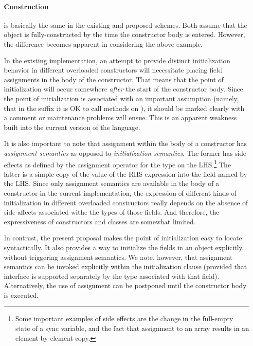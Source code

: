 \paragraph{Construction} is basically the same in the existing and proposed schemes.
Both assume that the object is fully-constructed by the time the constructor
body is entered.  However, the difference becomes apparent in considering the
above example.

In the existing implementation, an attempt to provide distinct
initialization behavior in different overloaded constructors will necessitate placing
field assignments in the body of the constructor.  That means that the point of
initialization will occur somewhere \emph{after} the start of the constructor
body.  Since the point of initialization is associated with an important
assumption (namely, that in the suffix it is OK to call methods on ),
it should be marked clearly with a comment or maintenance problems will ensue.
This is an apparent weakness built into the current version of the language.

It is also important to note that assignment within the body of a constructor
has \emph{assignment semantics} as opposed to \emph{initialization semantics}.
The former has side effects as defined by the assignment operator for the type
on the LHS.\footnote{Some important examples of side effects are the change in the
full-empty state of a sync variable, and the fact that assignment to an array
results in an element-by-element copy.}  The latter is a simple copy of the
value of the RHS expression into the field named by the LHS.  Since only
assignment semantics are available in the body of a constructor in the current
implementation, the expression of different kinds of initialization in different
overloaded constructors really depends on the absence of side-affects associated
withe the types of those fields.  And therefore, the expressiveness of
constructors and classes are somewhat limited.

In contrast, the present proposal makes the point of initialization
easy to locate syntactically.  It also provides a way to initialize the fields
in an object explicitly, without triggering assignment semantics.  
We note, however, that assignment semantics can be invoked explicitly within the
initialization clause (provided that interface is supported separately by the
type associated with that field).  Alternatively, the use of assignment can be
postponed until the constructor body is executed.

